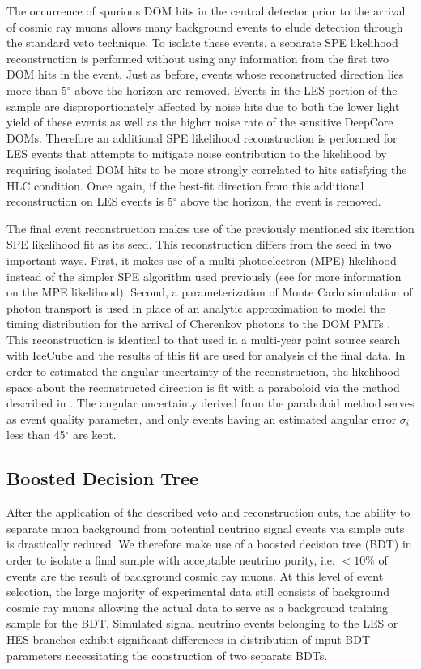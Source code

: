 \documentclass[manuscript]{aastex}
\begin{document}
The occurrence of spurious DOM hits in the central detector prior to the arrival of cosmic ray muons allows many background events to elude detection through the standard veto technique. To isolate these events, a separate SPE likelihood reconstruction is performed without using any information from the first two DOM hits in the event. Just as before, events whose reconstructed direction lies more than 5$^{\circ}$ above the horizon are removed. Events in the LES portion of the sample are disproportionately affected by noise hits due to both the lower light yield of these events as well as the higher noise rate of the sensitive DeepCore DOMs. Therefore an additional SPE likelihood reconstruction is performed for LES events that attempts to mitigate noise contribution to the likelihood by requiring isolated DOM hits to be more strongly correlated to hits satisfying the HLC condition. Once again, if the best-fit direction from this additional reconstruction on LES events is 5$^{\circ}$ above the horizon, the event is removed.

The final event reconstruction makes use of the previously mentioned six iteration SPE likelihood fit as its seed. This reconstruction differs from the seed in two important ways. First, it makes use of a multi-photoelectron (MPE) likelihood instead of the simpler SPE algorithm used previously (see \cite{2004NIMPA.524..169A} for more information on the MPE likelihood). Second, a parameterization of Monte Carlo simulation of photon transport is used in place of an analytic approximation to model the timing distribution for the arrival of Cherenkov photons to the DOM PMTs \citep{2013CoPhC.184.2214W}. This reconstruction is identical to that used in a multi-year point source search with IceCube \citep{2014ApJ...796..109A} and the results of this fit are used for analysis of the final data. In order to estimated the angular uncertainty of the reconstruction, the likelihood space about the reconstructed direction is fit with a paraboloid via the method described in \cite{2006APh....25..220N}. The angular uncertainty derived from the paraboloid method serves as event quality parameter, and only events having an estimated angular error $\sigma_i$ less than 45$^{\circ}$ are kept.
 
\subsection{Boosted Decision Tree}
After the application of the described veto and reconstruction cuts, the ability to separate muon background from potential neutrino signal events via simple cuts is drastically reduced. We therefore make use of a boosted decision tree (BDT) in order to isolate a final sample with acceptable neutrino purity, i.e. $<10 \%$ of events are the result of background cosmic ray muons. At this level of event selection, the large majority of experimental data still consists of background cosmic ray muons allowing the actual data to serve as a background training sample for the BDT. Simulated signal neutrino events belonging to the LES or HES branches exhibit significant differences in distribution of input BDT parameters necessitating the construction of two separate BDTs. 
\end{document}
